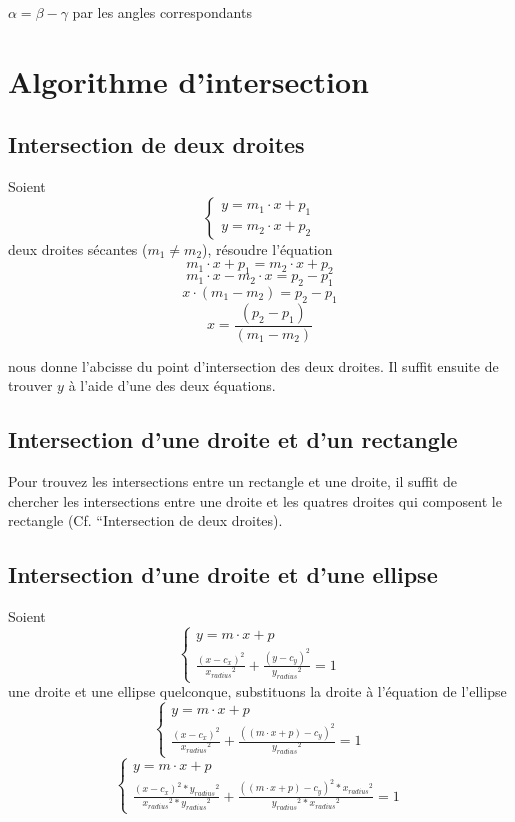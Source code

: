 \documentclass[a4paper,11pt]{report}
\begin{document}
$\alpha = \beta - \gamma$ par les angles correspondants
\section[Intersection]{Algorithme d'intersection}

\subsection[Deux droites]{Intersection de deux droites}
Soient \\
$$\begin{cases}
	y = m_1 \cdot x + p_1 \\
	y = m_2 \cdot x + p_2
\end{cases}$$
deux droites sécantes ($m_1 \ne m_2$), résoudre l'équation \\
$$m_1 \cdot x + p_1 = m_2 \cdot x + p_2$$
$$m_1 \cdot x - m_2 \cdot x = p_2 - p_1 $$
$$x \cdot (m_1 - m_2) = p_2 - p_1$$
$$x = \frac{(p_2 - p_1)}{(m_1 - m_2)}$$

nous donne l'abcisse du point d'intersection des deux droites.
Il suffit ensuite de trouver $y$ à l'aide d'une des deux équations.

\subsection[Droite et rectangle]{Intersection d'une droite et d'un rectangle}
Pour trouvez les intersections entre un rectangle et une droite, il suffit de
chercher les intersections entre une droite et les quatres droites qui composent
le rectangle (Cf. ``Intersection de deux droites).

\subsection[Droite et ellipse]{Intersection d'une droite et d'une ellipse}
Soient \\
$$\begin{cases}
	y = m \cdot x + p \\
	\frac{(x - c_x)^2}{{x_{radius}}^2} + \frac{(y - c_y)^2}{{y_{radius}}^2} = 1
\end{cases}$$
une droite et une ellipse quelconque, substituons la droite à l'équation de
l'ellipse
$$\begin{cases}
	y = m \cdot x + p \\
	\frac{(x - c_x)^2}{{x_{radius}}^2} + \frac{((m \cdot x + p) - c_y)^2}{{y_{radius}}^2} = 1
\end{cases}$$
$$\begin{cases}
	y = m \cdot x + p \\
	\frac{(x - c_x)^2 * {y_{radius}}^2}{{x_{radius}}^2 * {y_{radius}}^2} +
	\frac{((m \cdot x + p) - c_y)^2 * {x_{radius}}^2}{{y_{radius}}^2 * {x_{radius}}^2} = 1
\end{cases}$$
\end{document}
